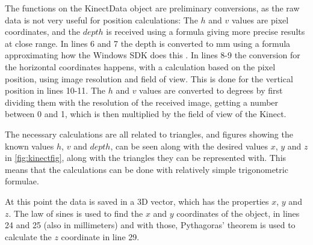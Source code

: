 

The functions on the KinectData object are preliminary conversions,
as the raw data is not very useful for position calculations: The $h$ and $v$ values are pixel coordinates, and the $depth$
is received using a formula giving more precise results at close range. 
In lines 6 and 7 the depth is converted to mm using a formula approximating how the Windows SDK does this \cite{depthconversion}. 
In lines 8-9 the conversion for the horizontal coordinates happens, with a calculation based on the pixel position, using image resolution and field of view. This is done for the vertical position in lines 10-11. The $h$ and $v$ values are converted to degrees by first dividing them with the resolution of the received image, getting
a number between 0 and 1, which is then multiplied by the field of view of the Kinect.

The necessary calculations are all related to triangles, and figures showing the known values $h$, $v$ and $depth$,
can be seen along with the desired values $x$, $y$ and $z$ in \autoref{fig:kinectfig},
along with the triangles they can be represented with. This means that the calculations can be done with relatively
simple trigonometric formulae.

At this point the data is saved in a 3D vector, which has the properties  $x$, $y$ and $z$. The law of sines is used to find the $x$ and $y$ coordinates of the object, in lines 24 and 25 (also in
millimeters) and with those, Pythagoras' theorem is used to calculate the $z$ coordinate in line 29.

